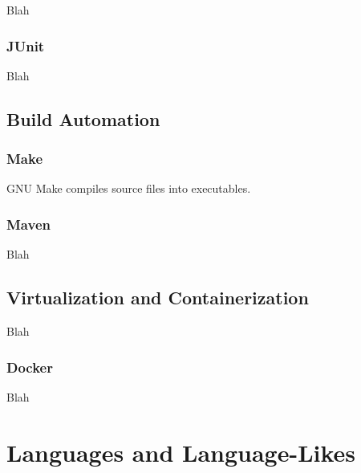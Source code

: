 Blah

\subsubsection{JUnit}

Blah

\subsection{Build Automation}

\subsubsection{Make}

GNU Make compiles source files into executables.



\subsubsection{Maven}

Blah


\subsection{Virtualization and Containerization}

Blah

\subsubsection{Docker}

Blah


\toclineskip
\section{Languages and Language-Likes}



